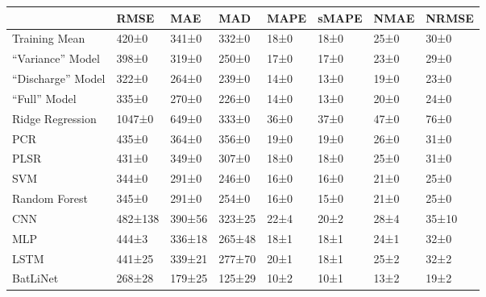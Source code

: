 \begin{tabular}{llllllll}
\toprule
 & RMSE & MAE & MAD & MAPE & sMAPE & NMAE & NRMSE \\
\midrule
Training Mean & 420±0 & 341±0 & 332±0 & 18±0 & 18±0 & 25±0 & 30±0 \\
``Variance'' Model & 398±0 & 319±0 & 250±0 & 17±0 & 17±0 & 23±0 & 29±0 \\
``Discharge'' Model & 322±0 & 264±0 & 239±0 & 14±0 & 13±0 & 19±0 & 23±0 \\
``Full'' Model & 335±0 & 270±0 & 226±0 & 14±0 & 13±0 & 20±0 & 24±0 \\
Ridge Regression & 1047±0 & 649±0 & 333±0 & 36±0 & 37±0 & 47±0 & 76±0 \\
PCR & 435±0 & 364±0 & 356±0 & 19±0 & 19±0 & 26±0 & 31±0 \\
PLSR & 431±0 & 349±0 & 307±0 & 18±0 & 18±0 & 25±0 & 31±0 \\
SVM & 344±0 & 291±0 & 246±0 & 16±0 & 16±0 & 21±0 & 25±0 \\
Random Forest & 345±0 & 291±0 & 254±0 & 16±0 & 15±0 & 21±0 & 25±0 \\
CNN & 482±138 & 390±56 & 323±25 & 22±4 & 20±2 & 28±4 & 35±10 \\
MLP & 444±3 & 336±18 & 265±48 & 18±1 & 18±1 & 24±1 & 32±0 \\
LSTM & 441±25 & 339±21 & 277±70 & 20±1 & 18±1 & 25±2 & 32±2 \\
BatLiNet & 268±28 & 179±25 & 125±29 & 10±2 & 10±1 & 13±2 & 19±2 \\
\bottomrule
\end{tabular}
